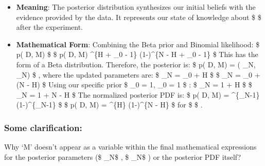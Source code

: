 \documentclass[11pt]{article}
\providecommand{\tightlist}{%
      \setlength{\itemsep}{0pt}\setlength{\parskip}{0pt}}
\begin{document}
\begin{itemize}
\tightlist
\item
  \textbf{Meaning}: The posterior distribution synthesizes our initial
  beliefs with the evidence provided by the data. It represents our
  state of knowledge about \$ \theta \$ after the experiment.
\item
  \textbf{Mathematical Form}: Combining the Beta prior and Binomial
  likelihood: \$ p(\theta \textbar{} D, M)
    \$
  \$ p(\theta \textbar{} D, M) \propto \theta\^{}\{H + \alpha\_0 - 1\}
  (1-\theta)\^{}\{N - H + \beta\_0 - 1\} \$ This has the form of a Beta
  distribution. Therefore, the posterior is: \$ p(\theta \textbar{} D,
  M) = (\theta \textbar{} \alpha\_N, \beta\_N) \$ , where the
  updated parameters are: \$ \alpha\_N = \alpha\_0 + H \$ \$ \beta\_N =
  \beta\_0 + (N - H) \$ Using our specific prior \$ \alpha\_0 = 1,
  \beta\_0 = 1 \$ : \$ \alpha\_N = 1 + H \$ \$ \beta\_N = 1 + N - H \$
  The normalized posterior PDF is: \$ p(\theta \textbar{} D, M) =
  \theta\^{}\{\alpha\_N-1\} (1-\theta)\^{}\{\beta\_N-1\} \$ \$
  p(\theta \textbar{} D, M) =
   \theta\^{}\{H\}
  (1-\theta)\^{}\{N - H\} \$ for \$ \theta \in [0, 1] \$ .
\end{itemize}

    \subsubsection{Some clarification:}\label{some-clarification}

Why `M' doesn't appear as a variable within the final mathematical
expressions for the posterior parameters (\$ \alpha\_N\$ , \$ \beta\_N\$
) or the posterior PDF itself?
\end{document}
